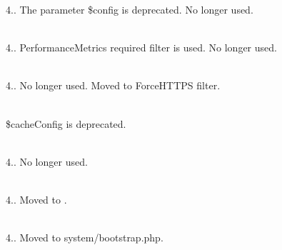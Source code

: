 \begin{DoxyRefList}
4.. The parameter \$config is deprecated. No longer used.  
\item[Member \doxylink{class_code_igniter_1_1_code_igniter_a76c796dbd8629d2ddf7ff26c34878568}{Code\+Igniter\textbackslash{}Code\+Igniter\+::display\+Performance\+Metrics} (string \$output)]\hfill \\
\label{deprecated__deprecated000030}%
%
4.. Performance\+Metrics required filter is used. No longer used.  
\item[Member \doxylink{class_code_igniter_1_1_code_igniter_ad11298dbb7245dc9ceb379b07cead19d}{Code\+Igniter\textbackslash{}Code\+Igniter\+::force\+Secure\+Access} (\$duration=31\+\_\+536\+\_\+000)]\hfill \\
\label{deprecated__deprecated000025}%
%
4.. No longer used. Moved to Force\+HTTPS filter.  
\item[Member \doxylink{class_code_igniter_1_1_code_igniter_a8eb7b9fc6743fe51b01448d3c625e272}{Code\+Igniter\textbackslash{}Code\+Igniter\+::gather\+Output} (?\doxylink{namespace_code_igniter_1_1_cache}{Cache} \$cache\+Config=null, \$returned=null)]\hfill \\
\label{deprecated__deprecated000032}%
%
\$cache\+Config is deprecated. 
\item[Member \doxylink{class_code_igniter_1_1_code_igniter_abbe04ca4087720e229d099756b0ff630}{Code\+Igniter\textbackslash{}Code\+Igniter\+::generate\+Cache\+Name} (\doxylink{namespace_code_igniter_1_1_cache}{Cache} \$config)]\hfill \\
\label{deprecated__deprecated000029}%
%
4.. No longer used.  
\item[Member \doxylink{class_code_igniter_1_1_code_igniter_ae9509e4e45ad9034ed3e8aa0a62780f3}{Code\+Igniter\textbackslash{}Code\+Igniter\+::initialize\+Kint} ()]\hfill \\
\label{deprecated__deprecated000019}%
%
4.. Moved to .  
\item[Member \doxylink{class_code_igniter_1_1_code_igniter_a27708bf92ab9971b7d6a876f416cd954}{Code\+Igniter\textbackslash{}Code\+Igniter\+::resolve\+Platform\+Extensions} ()]\hfill \\
\label{deprecated__deprecated000018}%
%
4.. Moved to system/bootstrap.\+php.  

\end{DoxyRefList}
